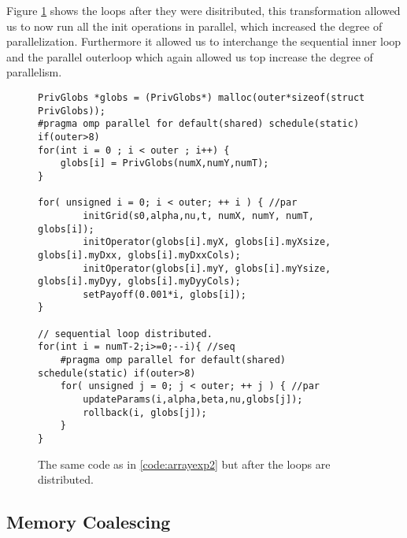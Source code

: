 Figure \ref{code:arrayexp3} shows the loops after they were disitributed, this
transformation allowed us to now run all the init operations in parallel, which
increased the degree of parallelization. Furthermore it allowed us to
interchange the sequential inner loop and the parallel outerloop which again
allowed us top increase the degree of parallelism.

\begin{figure}[H]
    \begin{lstlisting}
PrivGlobs *globs = (PrivGlobs*) malloc(outer*sizeof(struct PrivGlobs));
#pragma omp parallel for default(shared) schedule(static) if(outer>8)
for(int i = 0 ; i < outer ; i++) {
    globs[i] = PrivGlobs(numX,numY,numT);
}

for( unsigned i = 0; i < outer; ++ i ) { //par
        initGrid(s0,alpha,nu,t, numX, numY, numT, globs[i]);
        initOperator(globs[i].myX, globs[i].myXsize, globs[i].myDxx, globs[i].myDxxCols);
        initOperator(globs[i].myY, globs[i].myYsize, globs[i].myDyy, globs[i].myDyyCols);
        setPayoff(0.001*i, globs[i]);
}

// sequential loop distributed.
for(int i = numT-2;i>=0;--i){ //seq
    #pragma omp parallel for default(shared) schedule(static) if(outer>8)
    for( unsigned j = 0; j < outer; ++ j ) { //par
        updateParams(i,alpha,beta,nu,globs[j]);
        rollback(i, globs[j]);
    }
}
    \end{lstlisting}
    \caption{The same code as in \ref{code:arrayexp2} but after the loops are
    distributed.}
    \label{code:arrayexp3}
\end{figure}

\subsection{Memory Coalescing}